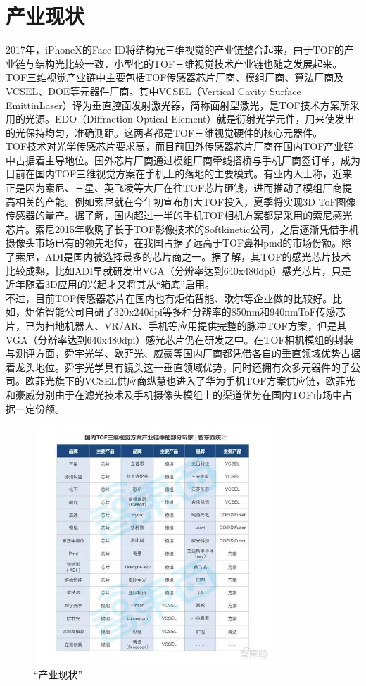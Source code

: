 \documentclass[UTF8]{ctexart}
\begin{document}
\section{产业现状}
2017年，iPhoneX的Face ID将结构光三维视觉的产业链整合起来，由于TOF的产业链与结构光比较一致，小型化的TOF三维视觉技术产业链也随之发展起来。TOF三维视觉产业链中主要包括TOF传感器芯片厂商、模组厂商、算法厂商及VCSEL、DOE等元器件厂商。其中VCSEL（Vertical Cavity Surface EmittinLaser）译为垂直腔面发射激光器，简称面射型激光，是TOF技术方案所采用的光源。EDO（Diffraction Optical Element）就是衍射光学元件，用来使发出的光保持均匀，准确测距。这两者都是TOF三维视觉硬件的核心元器件。\\
TOF技术对光学传感芯片要求高，而目前国外传感器芯片厂商在国内TOF产业链中占据着主导地位。国外芯片厂商通过模组厂商牵线搭桥与手机厂商签订单，成为目前在国内TOF三维视觉方案在手机上的落地的主要模式。有业内人士称，近来正是因为索尼、三星、英飞凌等大厂在往TOF芯片砸钱，进而推动了模组厂商提高相关的产能。例如索尼就在今年初宣布加大TOF投入，夏季将实现3D ToF图像传感器的量产。据了解，国内超过一半的手机TOF相机方案都是采用的索尼感光芯片。索尼2015年收购了长于TOF影像技术的Softkinetic公司，之后逐渐凭借手机摄像头市场已有的领先地位，在我国占据了远高于TOF鼻祖pmd的市场份额。除了索尼，ADI是国内被选择最多的芯片商之一。据了解，其TOF的感光芯片技术比较成熟，比如ADI早就研发出VGA（分辨率达到640x480dpi）感光芯片，只是近年随着3D应用的兴起才又将其从“箱底”启用。\\
不过，目前TOF传感器芯片在国内也有炬佑智能、歌尔等企业做的比较好。比如，炬佑智能公司自研了320x240dpi等多种分辨率的850nm和940nmToF传感芯片，已为扫地机器人、VR/AR、手机等应用提供完整的脉冲TOF方案，但是其VGA（分辨率达到640x480dpi）感光芯片仍在研发之中。在TOF相机模组的封装与测评方面，舜宇光学、欧菲光、威豪等国内厂商都凭借各自的垂直领域优势占据着龙头地位。舜宇光学具有镜头这一垂直领域优势，同时还拥有众多元器件的子公司。欧菲光旗下的VCSEL供应商纵慧也进入了华为手机TOF方案供应链，欧菲光和豪威分别由于在滤光技术及手机摄像头模组上的渠道优势在国内TOF市场中占据一定份额。\\
\begin{figure}
	\centering
	\includegraphics[width=0.8\textwidth]{产业现状.jpg}
	\caption{“产业现状”}
\end{figure}	
	
\end{document}
